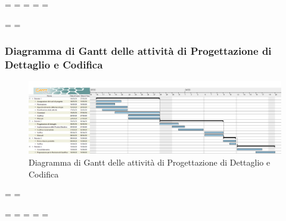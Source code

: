 \newpage
\paperwidth=\pdfpageheight
\paperheight=\pdfpagewidth
\pdfpageheight=\paperheight
\pdfpagewidth=\paperwidth
\headwidth=\textheight

\begingroup 
\vsize=\textwidth
\hsize=\textheight

\subsubsection{Diagramma di Gantt delle attività di Progettazione di Dettaglio e Codifica}
\pagestyle{empty}
\begin{figure}[h]
	\centering
	\includegraphics[scale=0.38]{Sezioni/DiagrammiGantt/ProgettazioneDiDettaglio.png}
	\caption{Diagramma di Gantt delle attività di Progettazione di Dettaglio e Codifica}
\end{figure}

\textwidth=\hsize
\textheight=\vsize

\endgroup
\newpage
\paperwidth=\pdfpageheight
\paperheight=\pdfpagewidth
\pdfpageheight=\paperheight
\pdfpagewidth=\paperwidth
\headwidth=\textwidth